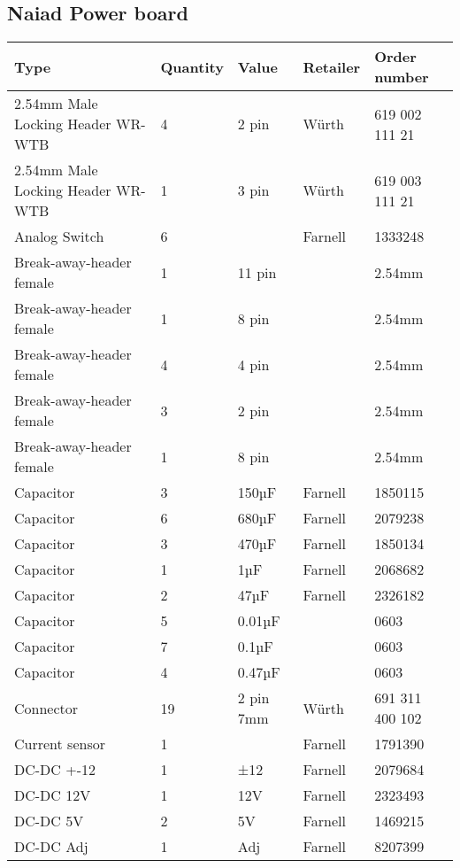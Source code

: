 \documentclass[10pt, titlepage]{article}
\begin{document}
\subsection{Naiad Power board}
\begin{center}
\begin{tabularx}{\textwidth}{|X|l|l|l|l|}
    \hline
   \textbf{Type} & \textbf{Quantity} & \textbf{Value} & \textbf{Retailer} & \textbf{Order number} \\ \hline
    2.54mm Male Locking Header WR-WTB & 4 & 2 pin & Würth & 619 002 111 21 \\ \hline
    2.54mm Male Locking Header WR-WTB & 1 & 3 pin & Würth & 619 003 111 21 \\ \hline
    Analog Switch & 6 & & Farnell & 1333248 \\ \hline
    Break-away-header female & 1 & 11 pin & & 2.54mm \\ \hline
    Break-away-header female & 1 & 8 pin & & 2.54mm \\ \hline
    Break-away-header female & 4 & 4 pin & & 2.54mm \\ \hline
    Break-away-header female & 3 & 2 pin & & 2.54mm \\ \hline
    Break-away-header female & 1 & 8 pin & & 2.54mm \\ \hline
    Capacitor & 3 & 150µF & Farnell & 1850115 \\ \hline
    Capacitor & 6 & 680µF & Farnell & 2079238 \\ \hline
    Capacitor & 3 & 470µF & Farnell & 1850134 \\ \hline
    Capacitor & 1 & 1µF & Farnell & 2068682 \\ \hline
    Capacitor & 2 & 47µF & Farnell & 2326182 \\ \hline
    Capacitor & 5 & 0.01µF & & 0603  \\ \hline
    Capacitor & 7 & 0.1µF & & 0603 \\ \hline
    Capacitor & 4 & 0.47µF & & 0603 \\ \hline
    Connector & 19 & 2 pin 7mm & Würth & 691 311 400 102 \\ \hline
    Current sensor & 1 & & Farnell & 1791390 \\ \hline
    DC-DC +-12 & 1 & ±12 & Farnell & 2079684 \\ \hline
    DC-DC 12V & 1 & 12V & Farnell & 2323493 \\ \hline
    DC-DC 5V & 2 & 5V & Farnell & 1469215 \\ \hline
    DC-DC Adj & 1 & Adj & Farnell & 8207399 \\ \hline

\end{tabularx}
\end{center}
\end{document}

